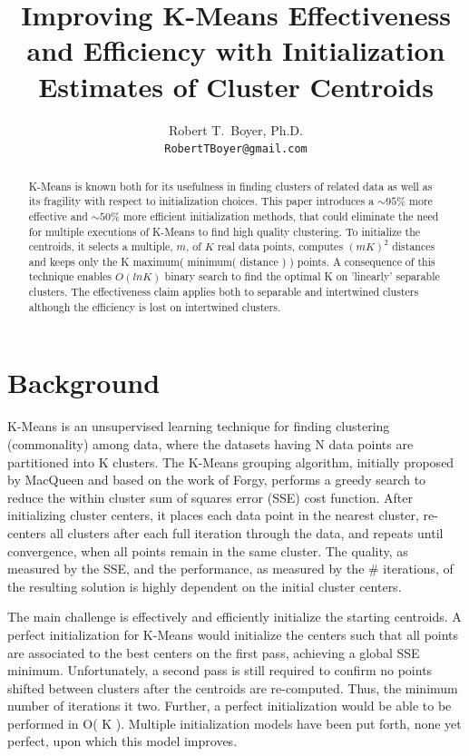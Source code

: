 \documentclass{article}
\title{Improving K-Means Effectiveness and Efficiency with Initialization Estimates of Cluster Centroids}
\author{%
  Robert T.~Boyer, Ph.D.\\
  \texttt{RobertTBoyer@gmail.com} \\
}
\begin{document}

\maketitle

\begin{abstract}
  K-Means is known both for its usefulness in finding clusters of related data as well as its fragility with respect to initialization choices.  This paper introduces a $\sim$$95\%$ more effective and $\sim$$50\%$ more efficient initialization methods, that could eliminate the need for multiple executions of K-Means to find high quality clustering.  To initialize the centroids, it selects a multiple, $m$, of $K$ real data points, computes $(mK)^2$ distances and keeps only the K maximum( minimum( distance ) ) points.  A consequence of this technique enables $O( ln K )$ binary search to find the optimal K on 'linearly' separable clusters.  The effectiveness claim applies both to separable and intertwined clusters although the efficiency is lost on intertwined clusters.
\end{abstract}

\section{Background}

K-Means is an unsupervised learning technique for finding clustering (commonality) among data, where the datasets having N data points are partitioned into K clusters. The K-Means grouping algorithm,  initially proposed by MacQueen\cite{macqueen} and based on the work of Forgy,\cite{forgy} performs a greedy search to reduce the within cluster sum of squares error (SSE) cost function.  After initializing cluster centers, it places each data point in the nearest cluster, re-centers all clusters after each full iteration through the data, and repeats until convergence, when all points remain in the same cluster.  The quality, as measured by the SSE, and the performance, as measured by the \# iterations, of the resulting solution is highly dependent on the initial cluster centers.  

The main challenge is effectively and efficiently initialize the starting centroids.  A perfect initialization for K-Means would initialize the centers such that all points are associated to the best centers on the first pass, achieving a global SSE minimum.  Unfortunately, a second pass is still required to confirm no points shifted between clusters after the centroids are re-computed.  Thus, the minimum number of iterations it two.  Further, a perfect initialization would be able to be performed in O( K ).  Multiple initialization models have been put forth, none yet perfect, upon which this model improves.
\end{document}
